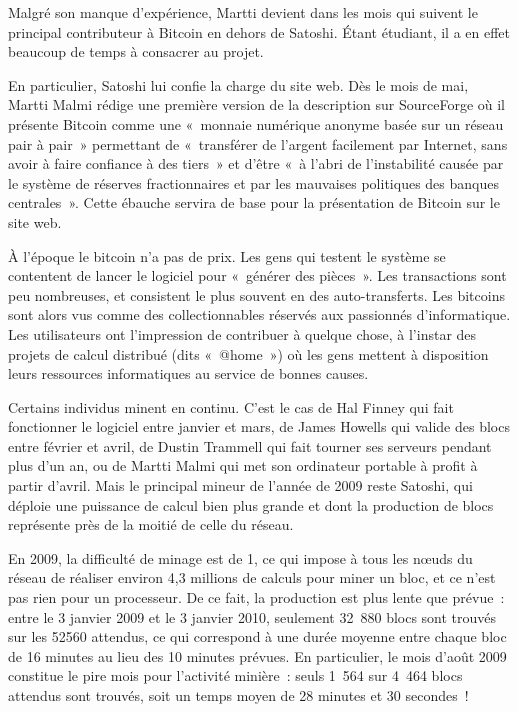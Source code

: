 \vspace{-1em}
Malgré son manque d'expérience, Martti devient dans les mois qui suivent le principal contributeur à Bitcoin en dehors de Satoshi. Étant étudiant, il a en effet beaucoup de temps à consacrer au projet.

En particulier, Satoshi lui confie la charge du site web. Dès le mois de mai, Martti Malmi rédige une première version de la description sur SourceForge où il présente Bitcoin comme une «~monnaie numérique anonyme basée sur un réseau pair à pair~» permettant de «~transférer de l'argent facilement par Internet, sans avoir à faire confiance à des tiers~» et d'être «~à l'abri de l'instabilité causée par le système de réserves fractionnaires et par les mauvaises politiques des banques centrales~». Cette ébauche servira de base pour la présentation de Bitcoin sur le site web.


À l'époque le bitcoin n'a pas de prix. Les gens qui testent le système se contentent de lancer le logiciel pour «~générer des pièces~». Les transactions sont peu nombreuses, et consistent le plus souvent en des auto-transferts. Les bitcoins sont alors vus comme des collectionnables réservés aux passionnés d'informatique. Les utilisateurs ont l'impression de contribuer à quelque chose, à l'instar des projets de calcul distribué (dits «~@home~») où les gens mettent à disposition leurs ressources informatiques au service de bonnes causes.

Certains individus minent en continu. C'est le cas de Hal Finney qui fait fonctionner le logiciel entre janvier et mars, de James Howells qui valide des blocs entre février et avril, de Dustin Trammell qui fait tourner ses serveurs pendant plus d'un an, ou de Martti Malmi qui met son ordinateur portable à profit à partir d'avril. Mais le principal mineur de l'année de 2009 reste Satoshi, qui déploie une puissance de calcul bien plus grande et dont la production de blocs représente près de la moitié de celle du réseau.

En 2009, la difficulté de minage est de 1, ce qui impose à tous les nœuds du réseau de réaliser environ 4,3 millions de calculs pour miner un bloc, et ce n'est pas rien pour un processeur. De ce fait, la production est plus lente que prévue~: entre le 3 janvier 2009 et le 3 janvier 2010, seulement 32~880 blocs sont trouvés sur les 52560 attendus, ce qui correspond à une durée moyenne entre chaque bloc de 16 minutes au lieu des 10 minutes prévues. En particulier, le mois d'août 2009 constitue le pire mois pour l'activité minière~: seuls 1~564 sur 4~464 blocs attendus sont trouvés, soit un temps moyen de 28 minutes et 30 secondes~!

